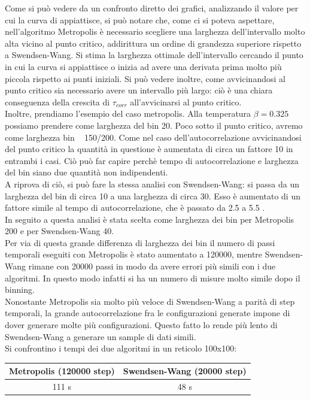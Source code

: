 Come si può vedere da un confronto diretto dei grafici, analizzando il valore per cui la curva di appiattisce, si può notare che, come ci si poteva aspettare, nell'algoritmo Metropolis è necessario scegliere una larghezza dell'intervallo molto alta vicino al punto critico, addirittura un ordine di grandezza superiore rispetto a Swendsen-Wang.
Si stima la larghezza ottimale dell'intervallo cercando il punto in cui la curva si appiattisce o inizia ad avere una derivata prima molto più piccola rispetto ai punti iniziali.
Si può vedere inoltre, come avvicinandosi al punto critico sia necessario avere un intervallo più largo: ciò è una chiara conseguenza della crescita di $\tau_{corr}$ all'avvicinarsi al punto critico.\\
Inoltre, prendiamo l'esempio del caso metropolis. Alla temperatura $\beta = 0.325$ possiamo prendere come larghezza del bin 20. Poco sotto il punto critico, avremo come larghezza bin ~ 150/200. Come nel caso dell'autocorrelazione avvicinandosi del punto critico la quantità in questione è aumentata di circa un fattore 10 in entrambi i casi.
Ciò può far capire perchè tempo di autocorrelazione e larghezza del bin siano due quantità non indipendenti.\\
A riprova di ciò, si può fare la stessa analisi con Swendsen-Wang: si passa da un larghezza del bin di circa 10 a una larghezza di circa 30. Esso è aumentato di un fattore simile al tempo di autocorrelazione, che è passato da 2.5 a 5.5 .\\
In seguito a questa analisi è stata scelta come larghezza dei bin per Metropolis  200 e per Swendsen-Wang 40.\\
Per via di questa grande differenza di larghezza dei bin il numero di passi temporali eseguiti con Metropolis è stato aumentato a 120000, mentre Swendsen-Wang rimane con 20000 passi in modo da avere errori più simili con i due algoritmi. In questo modo infatti si ha un numero di misure molto simile dopo il binning.\\
Nonostante Metropolis sia molto più veloce di Swendsen-Wang a parità di step temporali, la grande autocorrelazione fra le configurazioni generate impone di dover generare molte più configurazioni. Questo fatto lo rende più lento di Swendsen-Wang a generare un sample di dati simili.\\
Si confrontino i tempi dei due algoritmi in un reticolo 100x100:
\\
\begin{center}
\begin{tabular}{cc}
\toprule
	Metropolis (120000 step) & Swendsen-Wang (20000 step) \\
\midrule
	111 s & 48 s \\
\bottomrule
\end{tabular} 
\end{center}

